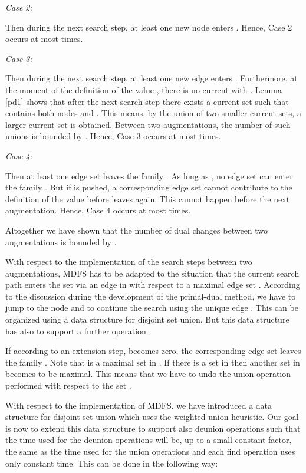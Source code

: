 \documentclass[12pt,twoside,a4paper]{article}
\begin{document}
\medskip
\noindent
{\em Case 2:\/} 

\medskip
Then during the next search step, at least one new node  enters .
Hence, Case 2 occurs at most  times.

\medskip
\noindent
{\em Case 3:\/} 

\medskip
Then during the next search step, at least one new edge  enters 
. Furthermore, at the moment of the definition of the value ,
there is no current  with . Lemma \ref{pd1}
shows that after the next search step there exists a current set 
such that  contains both nodes  and . This means, by the
union of two smaller current sets, a larger current set is obtained. 
Between two augmentations, the number of such unions is bounded by .
Hence, Case 3 occurs at most  times. 

\medskip
\noindent
{\em Case 4:\/} 

\medskip
Then at least one edge set  leaves the family . As long as 
, no edge set  can enter the family .
But if  is pushed, a corresponding edge set  cannot contribute to 
the definition of the value  before  leaves  again. 
This cannot happen before the next augmentation. Hence, Case 4 occurs at most 
 times.

\medskip
Altogether we have shown that the number of dual changes between two augmentations
is bounded by .

\medskip
With respect to the implementation of the search steps between two augmentations,
MDFS has to be adapted to the situation that the current search path enters
the set  via an edge in 
with respect to a maximal edge set .
According to the discussion during the development of the primal-dual method,
we have to jump to the node  and to continue the search using the unique edge
. This can be organized using a data structure for
disjoint set union. But this data structure has also to support a further operation.

If according to an extension step,  becomes zero, the corresponding edge
set leaves the family . Note that  is a maximal set in . 
If there is a set  in  then another set in  becomes 
to be maximal. This means that we have to undo the union operation performed with respect 
to the set . 

With respect to the implementation of MDFS, we have introduced a data structure for
disjoint set union which uses the weighted union heuristic. Our goal is now to extend
this data structure to support also deunion operations such that the time used for the 
deunion operations will be, up to
a small constant factor, the same as the time used for the union operations and each 
find operation uses only constant time. This can be done in the following way:
\end{document}
